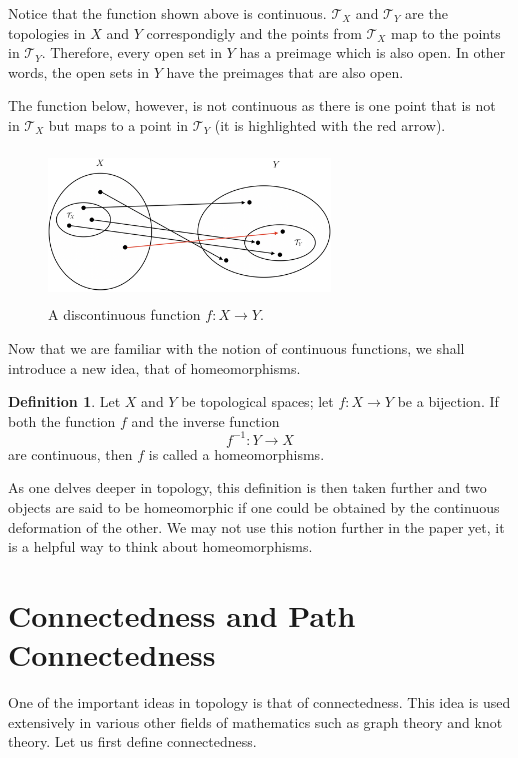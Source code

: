 \documentclass[a4paper, twocolumn]{article}
\newcommand{\topology}{\mathcal{T}}              %
\theoremstyle{definition}
\newtheorem*{definition}{Definition}
\begin{document}
Notice that the function shown above is continuous. $\topology_X$ and $\topology_Y$ are the topologies in $X$ and $Y$ correspondigly
and the points from $\topology_X$ map to the points in $\topology_Y$. Therefore, every open set in $Y$ has
a preimage which is also open. In other words, the open sets in $Y$ have the preimages
that are also open.

\medskip

The function below, however, is not continuous as there is one point that is not in $\topology_X$
but maps to a point in $\topology_Y$ (it is highlighted with the red arrow).

\begin{figure}[H]
    \centering
    \includegraphics[width=7.5cm, height=4cm]{discontinuous-function}
    \caption*{A discontinuous function $f : X \to Y$.}
\end{figure}

\medskip

Now that we are familiar with the notion of continuous functions, we shall introduce a new idea, that of homeomorphisms.

\begin{definition}
\cite{6} Let $X$ and $Y$ be topological spaces; let $f : X \to Y$ be a bijection. If both the function $f$
and the inverse function
$$f^{-1} : Y \to X$$
are continuous, then $f$ is called a homeomorphisms.
\end{definition}

As one delves deeper in topology, this definition is then taken further and two objects are said to be homeomorphic if
one could be obtained by the continuous deformation of the other. We may not use this notion further in the paper yet,
it is a helpful way to think about homeomorphisms.




\section*{\centering Connectedness and Path Connectedness}
One of the important ideas in topology is that of connectedness.
This idea is used extensively in various other fields of mathematics such as graph theory and knot theory.
Let us first define connectedness.
\end{document}
